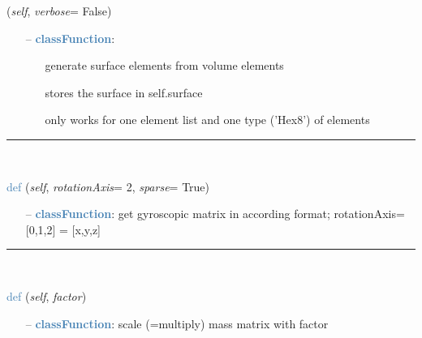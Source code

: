 \begin{itemize}[leftmargin=1.4cm]
\begin{itemize}[leftmargin=1.4cm]
\begin{itemize}[leftmargin=0.5cm]
\begin{itemize}[leftmargin=1.4cm]
\begin{itemize}[leftmargin=1.4cm]
\begin{itemize}[leftmargin=0.5cm]
\begin{flushleft}
({\it self}, {\it verbose}= False)
\end{flushleft}
\setlength{\itemindent}{0.7cm}
\begin{itemize}[leftmargin=0.7cm]
  \item[--]  \textcolor{steelblue}{\bf classFunction}: \vspace{-6pt}
  \begin{itemize}[leftmargin=1.2cm]
\setlength{\itemindent}{-0.7cm}
    \item[] generate surface elements from volume elements
    \item[] stores the surface in self.surface
    \item[] only works for one element list and one type ('Hex8') of elements
  \end{itemize}
\vspace{12pt}\end{itemize}
%
\noindent\rule{8cm}{0.75pt}\vspace{1pt} \\ 
\begin{flushleft}
\noindent \textcolor{steelblue}{def {\bf {}}}\label{sec:FEM:FEMinterface:GetGyroscopicMatrix}
({\it self}, {\it rotationAxis}= 2, {\it sparse}= True)
\end{flushleft}
\setlength{\itemindent}{0.7cm}
\begin{itemize}[leftmargin=0.7cm]
  \item[--]  \textcolor{steelblue}{\bf classFunction}: get gyroscopic matrix in according format; rotationAxis=[0,1,2] = [x,y,z]\vspace{12pt}\end{itemize}
%
\noindent\rule{8cm}{0.75pt}\vspace{1pt} \\ 
\begin{flushleft}
\noindent \textcolor{steelblue}{def {\bf {}}}\label{sec:FEM:FEMinterface:ScaleMassMatrix}
({\it self}, {\it factor})
\end{flushleft}
\setlength{\itemindent}{0.7cm}
\begin{itemize}[leftmargin=0.7cm]
  \item[--]  \textcolor{steelblue}{\bf classFunction}: scale (=multiply) mass matrix with factor\vspace{12pt}\end{itemize}

\end{itemize}
\end{itemize}
\end{itemize}
\end{itemize}
\end{itemize}
\end{itemize}
